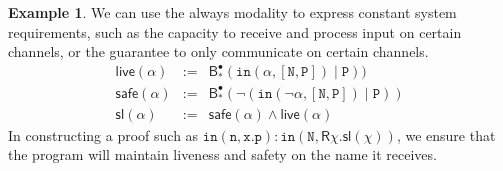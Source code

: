 \documentclass[12pt]{article}
\theoremstyle{definition}
\newtheorem{example}[theorem]{Example}
\newcommand{\msf}[1]{\mathsf{#1}}
\newcommand{\mtt}[1]{\mathtt{#1}}
\newcommand{\ttx}{\mtt{x}}
\newcommand{\N}{\mtt{N}}
\newcommand{\PP}{\mtt{P}}
\newcommand{\tti}{\mtt{in}}
\newcommand{\n}{\mtt{n}}
\newcommand{\p}{\mtt{p}}
\begin{document}
\begin{example}
    We can use the always modality to express constant system requirements, such as the capacity to receive and process input on certain channels, or the guarantee to only communicate on certain channels.
    \[\begin{array}{lcr}
        \msf{live}(\alpha) & := & \msf{B}_*^\bullet(\tti(\alpha,[\N,\PP]) \;|\; \PP))\\
        \msf{safe}(\alpha) & := & \msf{B}_*^\bullet(\neg(\tti(\neg\alpha,[\N,\PP]) \;|\; \PP))\\
        \msf{sl}(\alpha) & := & \msf{safe}(\alpha)\land \msf{live}(\alpha)
    \end{array}\]
In constructing a proof such as $\tti(\n,\ttx.\p):\tti(\N,\msf{R}\chi.\msf{sl}(\chi))$, we ensure that the program will maintain liveness and safety on the name it receives.
\end{example}
\end{document}
